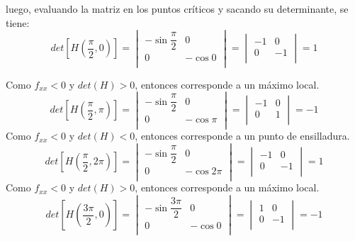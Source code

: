 \documentclass[a4paper,12pt]{article}
\begin{document}
		luego, evaluando la matriz en los puntos críticos y sacando su determinante,
		se tiene:
		$$det[H(\frac{\pi}{2}, 0)] =
			\begin{vmatrix}
				-\sin \dfrac{\pi}{2} & 0 \\
				0  & - \cos 0 \\
			\end{vmatrix} =
			\begin{vmatrix}
				-1 & 0 \\
				 0 & -1 \\
			\end{vmatrix} = 1$$

		Como $f_{xx} < 0$ y $det(H) > 0$, entonces corresponde a un máximo local.\\
		$$det[H(\frac{\pi}{2}, \pi)] =
			\begin{vmatrix}
				-\sin \dfrac{\pi}{2} & 0 \\
				0  & - \cos \pi \\
			\end{vmatrix} =
			\begin{vmatrix}
				-1 & 0 \\
				 0 & 1 \\
			\end{vmatrix} = -1$$
		Como $f_{xx} < 0$ y $det(H) < 0$, entonces corresponde a un punto de ensilladura.\\
		$$det[H(\frac{\pi}{2}, 2\pi)] =
			\begin{vmatrix}
				-\sin \dfrac{\pi}{2} & 0 \\
				0  & - \cos 2\pi \\
			\end{vmatrix} =
			\begin{vmatrix}
				-1 & 0 \\
				 0 & -1 \\
			\end{vmatrix} = 1$$
		Como $f_{xx} < 0$ y $det(H) > 0$, entonces corresponde a un máximo local.\\


		$$det[H(\frac{3\pi}{2}, 0)] =
			\begin{vmatrix}
				-\sin \dfrac{3\pi}{2} & 0 \\
				0  & - \cos 0 \\
			\end{vmatrix} =
			\begin{vmatrix}
				1 & 0 \\
				 0 & -1 \\
			\end{vmatrix} = -1$$
\end{document}
